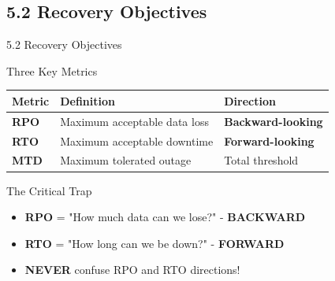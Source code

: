 \documentclass[9pt]{beamer}  %
\begin{document}
	\subsection{5.2 Recovery Objectives}
	\begin{frame}{5.2 Recovery Objectives}
		\begin{block}{Three Key Metrics}
			\begin{tabular}{|p{2.5cm}|p{4cm}|p{4.5cm}|}
				\hline
				\textbf{Metric} & \textbf{Definition} & \textbf{Direction} \\
				\hline
				\textbf{RPO} & Maximum acceptable data loss & \textbf{Backward-looking} \\
				\hline
				\textbf{RTO} & Maximum acceptable downtime & \textbf{Forward-looking} \\
				\hline
				\textbf{MTD} & Maximum tolerated outage & Total threshold \\
				\hline
			\end{tabular}
		\end{block}
		
		\begin{alertblock}{The Critical Trap}
			\begin{itemize}
				\item \textbf{RPO} = "How much data can we lose?" - \textbf{BACKWARD}
				\item \textbf{RTO} = "How long can we be down?" - \textbf{FORWARD}
				\item \textbf{NEVER} confuse RPO and RTO directions!
			\end{itemize}
		\end{alertblock}
	\end{frame}
	
\end{document}
